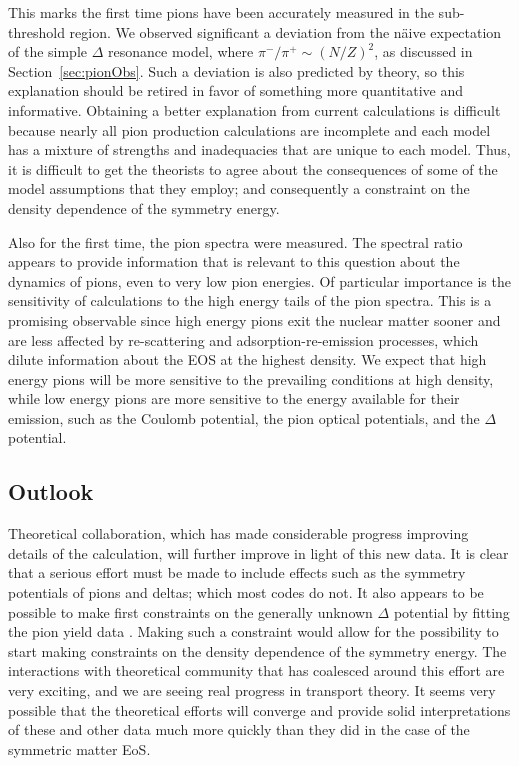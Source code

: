   This marks the first time pions have been accurately measured in the sub-threshold region. We observed significant a deviation from the  n\"aive expectation of the simple $\Delta$ resonance model, where $\pi^-/\pi^+ \sim (N/Z)^2$, as discussed in Section~\ref{sec:pionObs}. Such a deviation is also predicted by theory, so this explanation should be retired in favor of something more quantitative and informative. Obtaining a better explanation from current calculations is difficult because nearly all pion production calculations are incomplete and each model has a mixture of strengths and inadequacies that are unique to each model. Thus, it is difficult to get the theorists to agree about the consequences of some of the model assumptions that they employ; and consequently a constraint on the density dependence of the symmetry energy. 
  
  Also for the first time, the pion spectra were measured. The spectral ratio appears to provide information that is relevant to this question  about the dynamics of pions, even to very low pion energies. Of particular importance is the sensitivity of calculations to the high energy tails of the pion spectra. This is a promising observable since high energy pions  exit the nuclear matter sooner and are less affected by re-scattering and adsorption-re-emission processes, which dilute information about the EOS at the highest density. We expect that high energy pions will be more sensitive to the prevailing conditions at high density, while low energy pions are more sensitive to the energy available for their emission, such as the Coulomb potential, the pion optical potentials, and the $\Delta$ potential. 


\subsection{Outlook}
Theoretical collaboration, which has made considerable progress improving details of the calculation, will further improve in light of this new data. It is clear that a serious effort must be made to include effects such as the symmetry potentials of pions and deltas; which most codes do not. It also appears to be possible to make first constraints on the generally unknown $\Delta$ potential by fitting the pion yield data \cite{cozmaPC}. Making such a constraint would allow for the possibility to start making constraints on the density dependence of the symmetry energy. The interactions with theoretical community that has coalesced around this effort are very exciting, and we are seeing real progress in transport theory. It seems very possible that the theoretical efforts will converge and provide solid interpretations of these and other data much more quickly than they did in the case of the symmetric matter EoS. 


